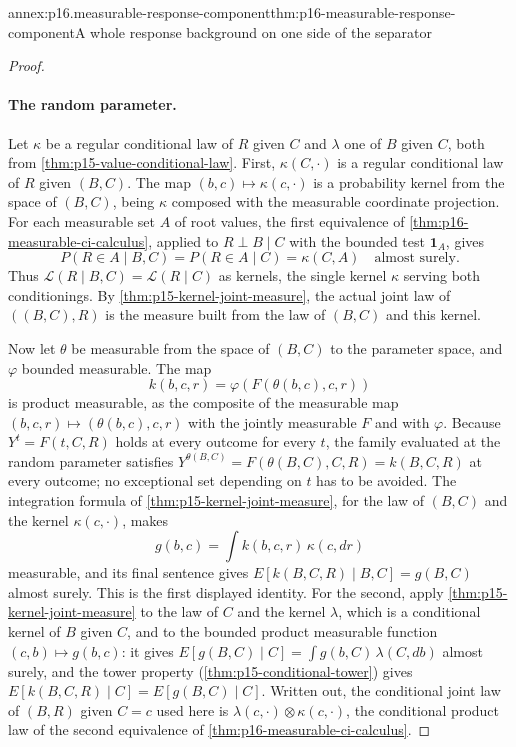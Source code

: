 \begin{annexitem}{annex:p16.measurable-response-component}{thm:p16-measurable-response-component}{A whole response background on one side of the separator}
\begin{proof}
\paragraph{The random parameter.}
Let \(\kappa\) be a regular conditional law of \(R\) given \(C\) and
\(\lambda\) one of \(B\) given \(C\), both from
\cref{thm:p15-value-conditional-law}. First, \(\kappa(C,\cdot)\) is a
regular conditional law of \(R\) given \((B,C)\). The map
\((b,c)\mapsto\kappa(c,\cdot)\) is a probability kernel from the space
of \((B,C)\), being \(\kappa\) composed with the measurable coordinate
projection. For each measurable set \(A\) of root values, the first
equivalence of \cref{thm:p16-measurable-ci-calculus}, applied to
\(R\perp B\mid C\) with the bounded test \(\mathbf 1_A\), gives
\[
 P(R\in A\mid B,C)=P(R\in A\mid C)=\kappa(C,A)
 \quad\text{almost surely}.
\]
Thus \(\mathcal L(R\mid B,C)=\mathcal L(R\mid C)\) as kernels, the
single kernel \(\kappa\) serving both conditionings. By
\cref{thm:p15-kernel-joint-measure}, the actual joint law of
\(((B,C),R)\) is the measure built from the law of \((B,C)\) and this
kernel.

Now let \(\theta\) be measurable from the space of \((B,C)\) to the
parameter space, and \(\varphi\) bounded measurable. The map
\[
 k(b,c,r)=\varphi(F(\theta(b,c),c,r))
\]
is product measurable, as the composite of the measurable map
\((b,c,r)\mapsto(\theta(b,c),c,r)\) with the jointly measurable \(F\)
and with \(\varphi\). Because \(Y^t=F(t,C,R)\) holds at every outcome
for every \(t\), the family evaluated at the random parameter satisfies
\(Y^{\theta(B,C)}=F(\theta(B,C),C,R)=k(B,C,R)\) at every outcome; no
exceptional set depending on \(t\) has to be avoided. The integration
formula of \cref{thm:p15-kernel-joint-measure}, for the law of
\((B,C)\) and the kernel \(\kappa(c,\cdot)\), makes
\[
 g(b,c)=\int k(b,c,r)\,\kappa(c,dr)
\]
measurable, and its final sentence gives
\(E[k(B,C,R)\mid B,C]=g(B,C)\) almost surely. This is the first
displayed identity. For the second, apply
\cref{thm:p15-kernel-joint-measure} to the law of \(C\) and the kernel
\(\lambda\), which is a conditional kernel of \(B\) given \(C\), and to
the bounded product measurable function \((c,b)\mapsto g(b,c)\): it gives
\(E[g(B,C)\mid C]=\int g(b,C)\,\lambda(C,db)\) almost surely, and
the tower property (\cref{thm:p15-conditional-tower}) gives
\(E[k(B,C,R)\mid C]=E[g(B,C)\mid C]\). Written out, the conditional
joint law of \((B,R)\) given \(C=c\) used here is
\(\lambda(c,\cdot)\otimes\kappa(c,\cdot)\), the conditional product law
of the second equivalence of \cref{thm:p16-measurable-ci-calculus}.


\end{proof}
\end{annexitem}
